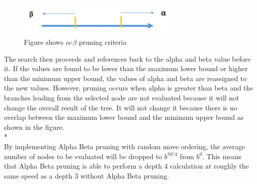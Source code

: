 \documentclass[11pt,a4paper]{article}
\begin{document}
\begin{figure}[H]
\centering
\includegraphics[width=0.7\textwidth]{alphabeta}
\caption{Figure shows $\alpha$-$\beta$ pruning criteria}
\label{fig:chess1}
\end{figure}

\indent The search then proceeds and references back to the alpha and beta value before it. If the values are found to be lower than the maximum lower bound or higher than the minimum upper bound, the values of alpha and beta are reassigned to the new values. However, pruning occurs when alpha is greater than beta and the branches leading from the selected node are not evaluated because it will not change the overall result of the tree. It will not change it because there is no overlap between the maximum lower bound and the minimum upper bound as shown in the figure.\cite{chess3}
\\*\\
\indent By implementing Alpha Beta pruning with random move ordering, the average number of nodes to be evaluated will be dropped to $b^{3d/4}$ from $b^d$. This means that Alpha Beta pruning is able to perform a depth 4 calculation at roughly the same speed as a depth 3 without Alpha Beta pruning.\cite{chess4}
\end{document}
